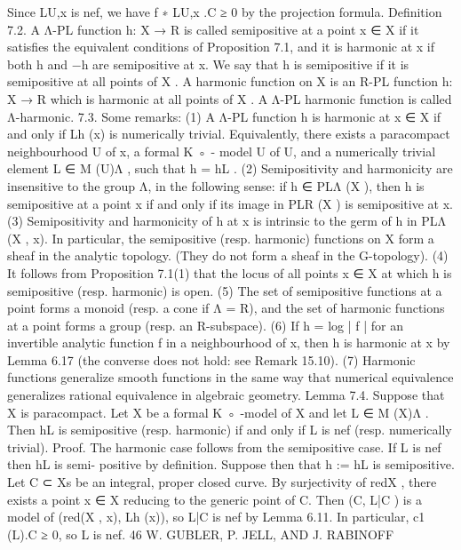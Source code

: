 \documentclass[
  10pt,
]{article}
\newenvironment{Shaded}{}{}
\newcommand{\NormalTok}[1]{#1}
\begin{document}
\begin{Shaded}
\begin{Highlighting}[]
\NormalTok{Since LU,x is nef, we have f ∗ LU,x .C ≥ 0 by the projection formula.                       }
\NormalTok{Definition 7.2. A Λ{-}PL function h: X → R is called semipositive at a point x ∈ X if it}
\NormalTok{satisfies the equivalent conditions of Proposition 7.1, and it is harmonic at x if both h}
\NormalTok{and −h are semipositive at x. We say that h is semipositive if it is semipositive at all}
\NormalTok{points of X .}
\NormalTok{   A harmonic function on X is an R{-}PL function h: X → R which is harmonic at all points}
\NormalTok{of X . A Λ{-}PL harmonic function is called Λ{-}harmonic.}
\NormalTok{7.3. Some remarks:}
\NormalTok{   (1) A Λ{-}PL function h is harmonic at x ∈ X if and only if Lh (x) is numerically trivial.}
\NormalTok{       Equivalently, there exists a paracompact neighbourhood U of x, a formal K ◦ {-}}
\NormalTok{       model U of U, and a numerically trivial element L ∈ M (U)Λ , such that h = hL .}
\NormalTok{   (2) Semipositivity and harmonicity are insensitive to the group Λ, in the following}
\NormalTok{       sense: if h ∈ PLΛ (X ), then h is semipositive at a point x if and only if its image in}
\NormalTok{       PLR (X ) is semipositive at x.}
\NormalTok{   (3) Semipositivity and harmonicity of h at x is intrinsic to the germ of h in PLΛ (X , x).}
\NormalTok{       In particular, the semipositive (resp. harmonic) functions on X form a sheaf in}
\NormalTok{       the analytic topology. (They do not form a sheaf in the G{-}topology).}
\NormalTok{   (4) It follows from Proposition 7.1(1) that the locus of all points x ∈ X at which h is}
\NormalTok{       semipositive (resp. harmonic) is open.}
\NormalTok{   (5) The set of semipositive functions at a point forms a monoid (resp. a cone if}
\NormalTok{       Λ = R), and the set of harmonic functions at a point forms a group (resp. an}
\NormalTok{       R{-}subspace).}
\NormalTok{   (6) If h = log | f | for an invertible analytic function f in a neighbourhood of x, then h}
\NormalTok{       is harmonic at x by Lemma 6.17 (the converse does not hold: see Remark 15.10).}
\NormalTok{   (7) Harmonic functions generalize smooth functions in the same way that numerical}
\NormalTok{       equivalence generalizes rational equivalence in algebraic geometry.}
\NormalTok{Lemma 7.4. Suppose that X is paracompact. Let X be a formal K ◦ {-}model of X and let L ∈}
\NormalTok{M (X)Λ . Then hL is semipositive (resp. harmonic) if and only if L is nef (resp. numerically}
\NormalTok{trivial).}
\NormalTok{Proof. The harmonic case follows from the semipositive case. If L is nef then hL is semi{-}}
\NormalTok{positive by definition. Suppose then that h := hL is semipositive. Let C ⊂ Xs be an}
\NormalTok{integral, proper closed curve. By surjectivity of redX , there exists a point x ∈ X reducing}
\NormalTok{to the generic point of C. Then (C, L|C ) is a model of (red(X , x), Lh (x)), so L|C is nef by}
\NormalTok{Lemma 6.11. In particular, c1 (L).C ≥ 0, so L is nef.                                       }
\NormalTok{46                               W. GUBLER, P. JELL, AND J. RABINOFF}


\end{Highlighting}
\end{Shaded}
\end{document}
